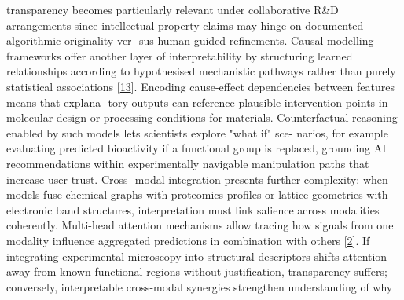\documentclass[
]{article}
\begin{document}
transparency becomes particularly relevant under collaborative R\&D
arrangements since intellectual property claims may hinge on documented
algorithmic originality ver- sus human-guided refinements. Causal
modelling frameworks offer another layer of interpretability by
structuring learned relationships according to hypothesised mechanistic
pathways rather than purely statistical associations
{[}\hyperref[_bookmark53]{13}{]}. Encoding cause-effect dependencies
between features means that explana- tory outputs can reference
plausible intervention points in molecular design or processing
conditions for materials. Counterfactual reasoning enabled by such
models lets scientists explore "what if" sce- narios, for example
evaluating predicted bioactivity if a functional group is replaced,
grounding AI recommendations within experimentally navigable
manipulation paths that increase user trust. Cross- modal integration
presents further complexity: when models fuse chemical graphs with
proteomics profiles or lattice geometries with electronic band
structures, interpretation must link salience across modalities
coherently. Multi-head attention mechanisms allow tracing how signals
from one modality influence aggregated predictions in combination with
others {[}\hyperref[_bookmark42]{2}{]}. If integrating experimental
microscopy into structural descriptors shifts attention away from known
functional regions without justification, transparency suffers;
conversely, interpretable cross-modal synergies strengthen understanding
of why
\end{document}
